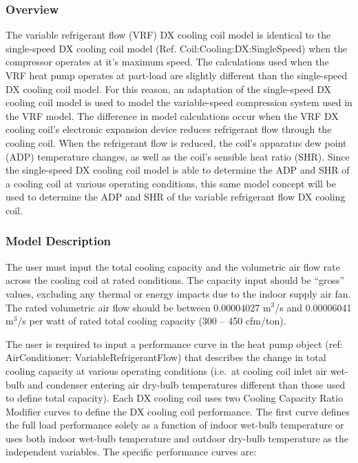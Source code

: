\subsubsection{Overview}\label{overview-12}

The variable refrigerant flow (VRF) DX cooling coil model is identical to the single-speed DX cooling coil model (Ref. Coil:Cooling:DX:SingleSpeed) when the compressor operates at it's maximum speed. The calculations used when the VRF heat pump operates at part-load are slightly different than the single-speed DX cooling coil model. For this reason, an adaptation of the single-speed DX cooling coil model is used to model the variable-speed compression system used in the VRF model. The difference in model calculations occur when the VRF DX cooling coil's electronic expansion device reduces refrigerant flow through the cooling coil. When the refrigerant flow is reduced, the coil's apparatus dew point (ADP) temperature changes, as well as the coil's sensible heat ratio (SHR). Since the single-speed DX cooling coil model is able to determine the ADP and SHR of a cooling coil at various operating conditions, this same model concept will be used to determine the ADP and SHR of the variable refrigerant flow DX cooling coil.

\subsubsection{Model Description}\label{model-description-9}

The user must input the total cooling capacity and the volumetric air flow rate across the cooling coil at rated conditions. The capacity input should be ``gross'' values, excluding any thermal or energy impacts due to the indoor supply air fan. The rated volumetric air flow should be between 0.00004027 m\(^{3}\)/s and 0.00006041 m\(^{3}\)/s per watt of rated total cooling capacity (300 -- 450 cfm/ton).

The user is required to input a performance curve in the heat pump object (ref: AirConditioner: VariableRefrigerantFlow) that describes the change in total cooling capacity at various operating conditions (i.e.~at cooling coil inlet air wet-bulb and condenser entering air dry-bulb temperatures different than those used to define total capacity). Each DX cooling coil uses two Cooling Capacity Ratio Modifier curves to define the DX cooling coil performance. The first curve defines the full load performance solely as a function of indoor wet-bulb temperature or uses both indoor wet-bulb temperature and outdoor dry-bulb temperature as the independent variables. The specific performance curves are:

